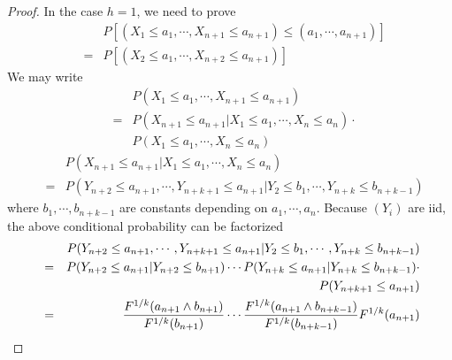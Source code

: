 \documentclass{report}
\begin{document}
\begin{enumerate}[1.]
\begin{enumerate}[(a)]
\begin{proof}
      In the case $h=1$, we need to prove
      \begin{eqnarray*}
        && P\left[(X_1 \le a_1, \cdots, X_{n+1} \le a_{n+1}) \le (a_1,
          \cdots, a_{n+1}) \right] \\
        &=& P\left[(X_2 \le a_1, \cdots, X_{n+2} \le a_{n+1}) \right]
      \end{eqnarray*}
      We may write
      \begin{eqnarray*}
        && P(X_1 \le a_1, \cdots, X_{n+1} \le a_{n+1}) \\
        &=& P(X_{n+1} \le a_{n+1} | X_1 \le a_1, \cdots, X_{n} \le
        a_{n}) \cdot \\
        && P(X_1 \le a_1, \cdots, X_{n} \le a_{n})
      \end{eqnarray*}
      \begin{eqnarray*}
        && P(X_{n+1} \le a_{n+1} | X_1 \le a_1, \cdots, X_{n} \le
        a_{n}) \\
        &=& P(Y_{n+2} \le a_{n+1}, \cdots, Y_{n+k+1} \le a_{n+1} | Y_2
        \le b_1, \cdots, Y_{n+k} \le b_{n+k-1})
      \end{eqnarray*}
      where $b_1, \cdots, b_{n+k-1}$ are constants depending on $a_1,
      \cdots, a_n$. Because $(Y_i)$ are iid, the above conditional
      probability can be factorized
      \begin{eqnarray*}
        && P(Y_{n+2} \le a_{n+1}, \cdots, Y_{n+k+1} \le a_{n+1} | Y_2
        \le b_1, \cdots, Y_{n+k} \le b_{n+k-1}) \\
        &=& P(Y_{n+2} \le a_{n+1} | Y_{n+2} \le b_{n+1}) \cdots
        P(Y_{n+k} \le a_{n+1} | Y_{n+k} \le b_{n+k-1}) \cdot \\
        && P(Y_{n+k+1} \le a_{n+1}) \\
        &=& {F^{1/k}(a_{n+1} \wedge b_{n+1}) \over F^{1/k}(b_{n+1})} \cdots
        {F^{1/k}(a_{n+1} \wedge b_{n+k-1}) \over F^{1/k}(b_{n+k-1})}
        F^{1/k}(a_{n+1})
      \end{eqnarray*}
      

\end{proof}
\end{enumerate}
\end{enumerate}
\end{document}
